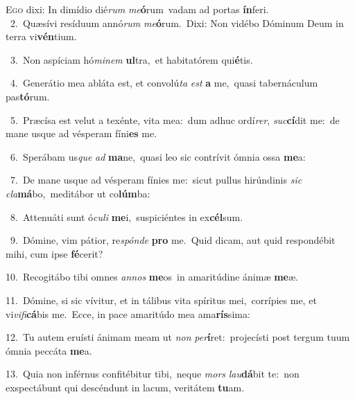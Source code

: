 \lettrine{\initial\textcolor{\initialcolor}{E}}{go} dixi: In dimídio dié\textit{rum} \textit{me}\-\textbf{ó}rum~\star vadam ad portas \textbf{ín}\-feri.\\
{\numbfont\textcolor{\numbcolor}{~2.}}~Quæsívi resíduum annó\textit{rum} \textit{me}\-\textbf{ó}rum.~\star Dixi: Non vidébo Dóminum Deum in terra vi\-\textbf{vén}\-tium.\par
{\numbfont\textcolor{\numbcolor}{~3.}}~Non aspíciam hó\-\textit{mi}\-\textit{nem} \textbf{ul}\-tra,~\star et habitatórem qui\-\textbf{é}\-tis.\par
{\numbfont\textcolor{\numbcolor}{~4.}}~Generátio mea abláta est, et convolú\textit{ta} \textit{est} \textbf{a} me,~\star quasi tabernáculum pas\-\textbf{tó}\-rum.\par
{\numbfont\textcolor{\numbcolor}{~5.}}~Præcísa est velut a texénte, vita mea:~\dagger dum adhuc ordí\-\textit{rer}\-, \textit{suc}\-\textbf{cí}dit me:~\star de mane usque ad vésperam fíni\textbf{es} me.\par
{\numbfont\textcolor{\numbcolor}{~6.}}~Sperábam us\textit{que} \textit{ad} \textbf{ma}\-ne,~\star quasi leo sic contrívit ómnia ossa \textbf{me}\-a:\par
{\numbfont\textcolor{\numbcolor}{~7.}}~De mane usque ad vésperam fínies me:~\dagger sicut pullus hirúndinis \textit{sic} \textit{cla}\-\textbf{má}bo,~\star meditábor ut co\-\textbf{lúm}\-ba:\par
{\numbfont\textcolor{\numbcolor}{~8.}}~Attenuáti sunt ó\-\textit{cu}\-\textit{li} \textbf{me}\-i,~\star suspiciéntes in ex\-\textbf{cél}\-sum.\par
{\numbfont\textcolor{\numbcolor}{~9.}}~Dómine, vim pátior, re\-\textit{spón}\-\textit{de} \textbf{pro} me.~\star Quid dicam, aut quid respondébit mihi, cum ipse \textbf{fé}\-cerit?\par
{\numbfont\textcolor{\numbcolor}{10.}}~Recogitábo tibi omnes \textit{an}\-\textit{nos} \textbf{me}\-os~\star in amaritúdine ánimæ \textbf{me}\-æ.\par
{\numbfont\textcolor{\numbcolor}{11.}}~Dómine, si sic vívitur, et in tálibus vita spíritus mei,~\dagger corrípies me, et vi\-\textit{vi}\-\textit{fi}\textbf{cá}bis me.~\star Ecce, in pace amaritúdo mea ama\-\textbf{rís}\-sima:\par
{\numbfont\textcolor{\numbcolor}{12.}}~Tu autem eruísti ánimam meam ut \textit{non} \textit{per}\-\textbf{í}ret:~\star projecísti post tergum tuum ómnia peccáta \textbf{me}\-a.\par
{\numbfont\textcolor{\numbcolor}{13.}}~Quia non inférnus confitébitur tibi,~\dagger neque \textit{mors} \textit{lau}\-\textbf{dá}bit te:~\star non exspectábunt qui descéndunt in lacum, veritátem \textbf{tu}\-am.\par
